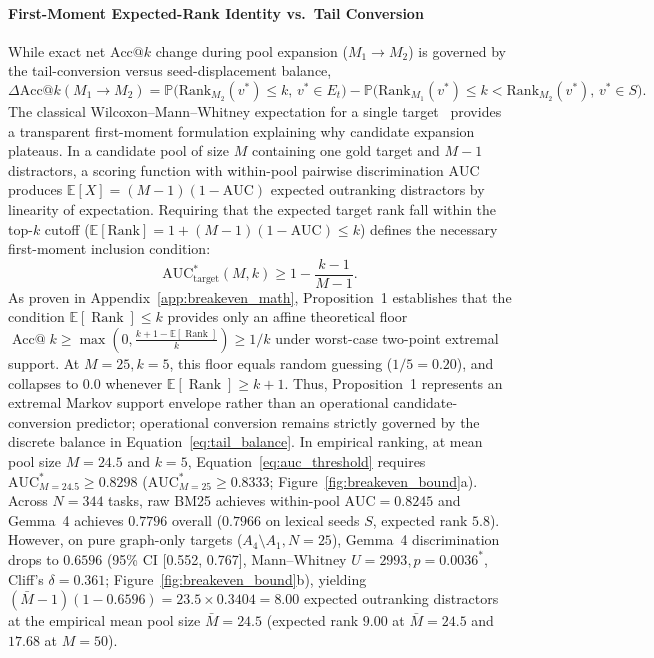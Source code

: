 \documentclass[10pt]{article}
\begin{document}
\paragraph{First-Moment Expected-Rank Identity vs.\ Tail Conversion}
While exact net $\text{Acc@}k$ change during pool expansion ($M_1 \to M_2$) is governed by the tail-conversion versus seed-displacement balance,
\begin{equation}
\Delta \text{Acc@}k(M_1 \to M_2) = \mathbb{P}\big(\text{Rank}_{M_2}(v^*) \le k,\, v^* \in E_t\big) - \mathbb{P}\big(\text{Rank}_{M_1}(v^*) \le k < \text{Rank}_{M_2}(v^*),\, v^* \in S\big).
\label{eq:tail_balance}
\end{equation}
The classical Wilcoxon--Mann--Whitney expectation for a single target~\cite{bamber1975area} provides a transparent first-moment formulation explaining why candidate expansion plateaus. In a candidate pool of size $M$ containing one gold target and $M-1$ distractors, a scoring function with within-pool pairwise discrimination $\text{AUC}$ produces $\mathbb{E}[X] = (M-1)(1-\text{AUC})$ expected outranking distractors by linearity of expectation. Requiring that the expected target rank fall within the top-$k$ cutoff ($\mathbb{E}[\text{Rank}] = 1 + (M-1)(1-\text{AUC}) \le k$) defines the necessary first-moment inclusion condition:
\begin{equation}
\text{AUC}^*_{\text{target}}(M, k) \ge 1 - \frac{k - 1}{M - 1}.
\label{eq:auc_threshold}
\end{equation}
As proven in Appendix~\ref{app:breakeven_math}, Proposition~1 establishes that the condition $\mathbb{E}[\operatorname{Rank}] \le k$ provides only an affine theoretical floor $\operatorname{Acc@}k \ge \max\left(0, \frac{k + 1 - \mathbb{E}[\operatorname{Rank}]}{k}\right) \ge 1/k$ under worst-case two-point extremal support. At $M=25, k=5$, this floor equals random guessing ($1/5 = 0.20$), and collapses to $0.0$ whenever $\mathbb{E}[\operatorname{Rank}] \ge k+1$. Thus, Proposition~1 represents an extremal Markov support envelope rather than an operational candidate-conversion predictor; operational conversion remains strictly governed by the discrete balance in Equation~\eqref{eq:tail_balance}. In empirical ranking, at mean pool size $M = 24.5$ and $k=5$, Equation~\eqref{eq:auc_threshold} requires $\text{AUC}^*_{M=24.5} \ge 0.8298$ ($\text{AUC}^*_{M=25} \ge 0.8333$; Figure~\ref{fig:breakeven_bound}a). Across $N=344$ tasks, raw BM25 achieves within-pool $\text{AUC} = 0.8245$ and Gemma~4 achieves $0.7796$ overall ($0.7966$ on lexical seeds $S$, expected rank $5.8$). However, on pure graph-only targets ($A_4 \setminus A_1, N=25$), Gemma~4 discrimination drops to $\mathbf{0.6596}$ (95\% CI [0.552, 0.767], Mann--Whitney $U=2993, p = 0.0036^*$, Cliff's $\delta = 0.361$; Figure~\ref{fig:breakeven_bound}b), yielding $(\bar{M}-1)(1 - 0.6596) = 23.5 \times 0.3404 = 8.00$ expected outranking distractors at the empirical mean pool size $\bar{M}=24.5$ (expected rank $9.00$ at $\bar{M}=24.5$ and $17.68$ at $M=50$).
\end{document}
